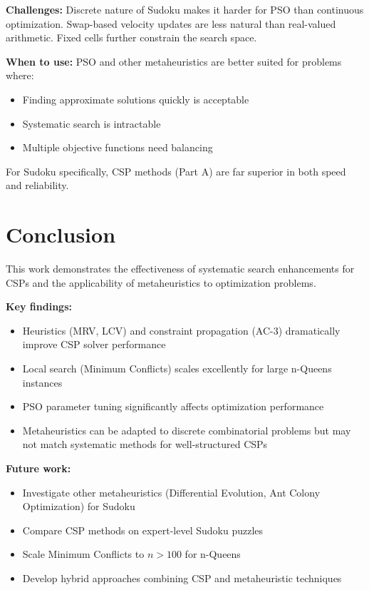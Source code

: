 \documentclass[letterpaper]{article}
\begin{document}
\textbf{Challenges:} Discrete nature of Sudoku makes it harder for PSO than continuous optimization. Swap-based velocity updates are less natural than real-valued arithmetic. Fixed cells further constrain the search space.

\textbf{When to use:} PSO and other metaheuristics are better suited for problems where:
\begin{itemize}
\item Finding approximate solutions quickly is acceptable
\item Systematic search is intractable
\item Multiple objective functions need balancing
\end{itemize}

For Sudoku specifically, CSP methods (Part A) are far superior in both speed and reliability.

\section{Conclusion}

This work demonstrates the effectiveness of systematic search enhancements for CSPs and the applicability of metaheuristics to optimization problems.

\textbf{Key findings:}
\begin{itemize}
\item Heuristics (MRV, LCV) and constraint propagation (AC-3) dramatically improve CSP solver performance
\item Local search (Minimum Conflicts) scales excellently for large n-Queens instances
\item PSO parameter tuning significantly affects optimization performance
\item Metaheuristics can be adapted to discrete combinatorial problems but may not match systematic methods for well-structured CSPs
\end{itemize}

\textbf{Future work:}
\begin{itemize}
\item Investigate other metaheuristics (Differential Evolution, Ant Colony Optimization) for Sudoku
\item Compare CSP methods on expert-level Sudoku puzzles
\item Scale Minimum Conflicts to $n > 100$ for n-Queens
\item Develop hybrid approaches combining CSP and metaheuristic techniques
\end{itemize}
\end{document}
